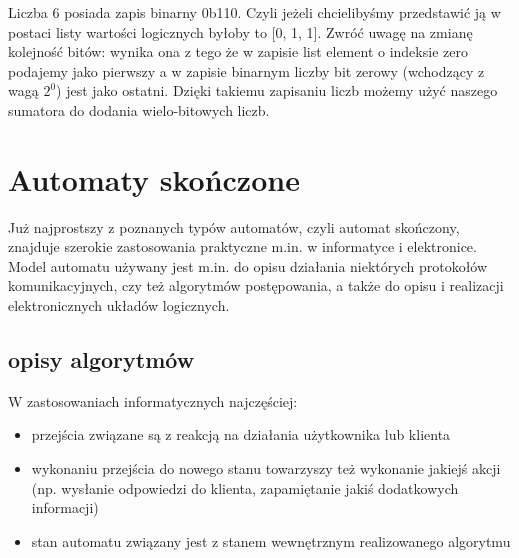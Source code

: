 \documentclass{pdfBooklets}
\begin{document}
Liczba 6 posiada zapis binarny 0b110. Czyli jeżeli chcielibyśmy przedstawić ją w postaci listy wartości logicznych byłoby to [0, 1, 1]. Zwróć uwagę na zmianę kolejność bitów: wynika ona z tego że w zapisie list element o indeksie zero podajemy jako pierwszy a w zapisie binarnym liczby bit zerowy (wchodzący z wagą $2^0$) jest jako ostatni. Dzięki takiemu zapisaniu liczb możemy użyć naszego sumatora do dodania wielo-bitowych liczb.



\section{Automaty skończone}

Już najprostszy z poznanych typów automatów, czyli automat skończony, znajduje szerokie zastosowania praktyczne m.in. w informatyce i elektronice. Model automatu używany jest m.in. do opisu działania niektórych protokołów komunikacyjnych, czy też algorytmów postępowania, a także do opisu i realizacji elektronicznych układów logicznych.

\subsection{opisy algorytmów}
W zastosowaniach informatycznych najczęściej:
\begin{itemize}
\item przejścia związane są z reakcją na działania użytkownika lub klienta
\item wykonaniu przejścia do nowego stanu towarzyszy też wykonanie jakiejś akcji (np. wysłanie odpowiedzi do klienta, zapamiętanie jakiś dodatkowych informacji)
\item stan automatu związany jest z stanem wewnętrznym realizowanego algorytmu
\end{itemize}
\end{document}
